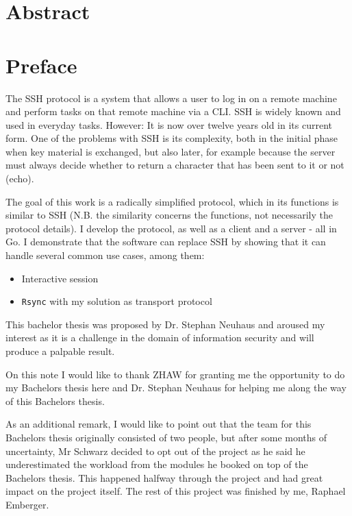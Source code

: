\documentclass[10pt,a4paper,titlepage,twoside,english,final]{zhawreprt}
\begin{document}
\maketitle

\chapter*{Abstract}\label{sec:Abstract}


\chapter*{Preface}\label{sec:Preface}
The \gls{SSH} protocol \citep{rfc253,rfc6668,rfc8268,rfc8308,rfc8332} is a system that allows a user to log in on a remote machine and perform tasks on that remote machine via a \gls{CLI}.
\gls{SSH} is widely known and used in everyday tasks.
However: It is now over twelve years old in its current form.
One of the problems with \gls{SSH} is its complexity, both in the initial phase when key material is exchanged, but also later, for example because the server must always decide whether to return a character that has been sent to it or not (echo).

The goal of this work is a radically simplified protocol, which in its functions is similar to \gls{SSH} (N.B. the similarity concerns the functions, not necessarily the protocol details).
I develop the protocol, as well as a client and a server - all in \gls{Go}.
I demonstrate that the software can replace \gls{SSH} by showing that it can handle several common use cases, among them:

\begin{itemize}
\item Interactive session
\item \texttt{Rsync} with my solution as transport protocol
\end{itemize}

This bachelor thesis was proposed by Dr. Stephan Neuhaus \citep{BA19_neut_03} and aroused my interest as it is a challenge in the domain of information security and will produce a palpable result.

On this note I would like to thank \gls{ZHAW} for granting me the opportunity to do my Bachelors thesis here and Dr. Stephan Neuhaus for helping me along the way of this Bachelors thesis.

As an additional remark, I would like to point out that the team for this Bachelors thesis originally consisted of two people, but after some months of uncertainty, Mr Schwarz decided to opt out of the project as he said he underestimated the workload from the modules he booked on top of the Bachelors thesis.
This happened halfway through the project and had great impact on the project itself.
The rest of this project was finished by me, Raphael Emberger.
\end{document}

